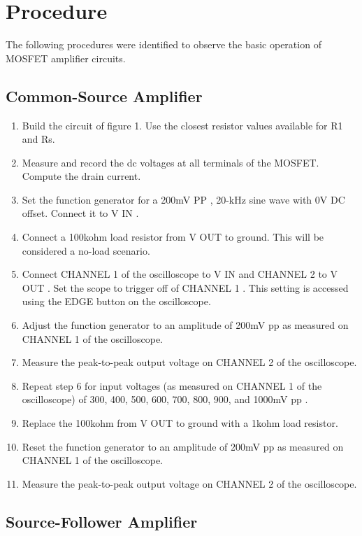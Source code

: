 \section{Procedure}
\label{sec:procedure}

The following procedures were identified to observe the basic operation of MOSFET amplifier circuits.

\subsection{Common-Source Amplifier}

\begin{enumerate}
\item Build the circuit of figure 1. Use the closest resistor values available for R1 and Rs.
\item Measure and record the dc voltages at all terminals of the MOSFET. Compute the drain current.
\item Set the function generator for a 200mV PP , 20-kHz sine wave with 0V DC offset. Connect it to V IN .
\item Connect a 100kohm load resistor from V OUT to ground. This will be considered a no-load scenario.
\item Connect CHANNEL 1 of the oscilloscope to V IN and CHANNEL 2 to V OUT . Set the scope to trigger off of CHANNEL 1 . This setting is accessed using the EDGE button on the oscilloscope.
\item Adjust the function generator to an amplitude of 200mV pp as measured on CHANNEL 1 of the oscilloscope.
\item Measure the peak-to-peak output voltage on CHANNEL 2 of the oscilloscope.
\item Repeat step 6 for input voltages (as measured on CHANNEL 1 of the oscilloscope) of 300, 400, 500, 600, 700, 800, 900, and 1000mV pp .
\item Replace the 100kohm from V OUT to ground with a 1kohm load resistor.
\item Reset the function generator to an amplitude of 200mV pp as measured on CHANNEL 1 of the oscilloscope.
\item Measure the peak-to-peak output voltage on CHANNEL 2 of the oscilloscope.
\end{enumerate}

\subsection{Source-Follower Amplifier}

